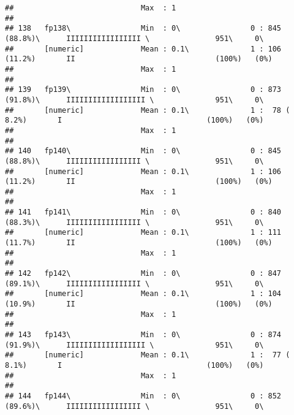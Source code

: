 \documentclass[]{article}
\begin{document}
\begin{verbatim}
##                             Max  : 1                                                                                           
## 
## 138   fp138\                Min  : 0\                0 : 845 (88.8%)\      IIIIIIIIIIIIIIIII \               951\     0\       
##       [numeric]             Mean : 0.1\              1 : 106 (11.2%)       II                                (100%)   (0%)     
##                             Max  : 1                                                                                           
## 
## 139   fp139\                Min  : 0\                0 : 873 (91.8%)\      IIIIIIIIIIIIIIIIII \              951\     0\       
##       [numeric]             Mean : 0.1\              1 :  78 ( 8.2%)       I                                 (100%)   (0%)     
##                             Max  : 1                                                                                           
## 
## 140   fp140\                Min  : 0\                0 : 845 (88.8%)\      IIIIIIIIIIIIIIIII \               951\     0\       
##       [numeric]             Mean : 0.1\              1 : 106 (11.2%)       II                                (100%)   (0%)     
##                             Max  : 1                                                                                           
## 
## 141   fp141\                Min  : 0\                0 : 840 (88.3%)\      IIIIIIIIIIIIIIIII \               951\     0\       
##       [numeric]             Mean : 0.1\              1 : 111 (11.7%)       II                                (100%)   (0%)     
##                             Max  : 1                                                                                           
## 
## 142   fp142\                Min  : 0\                0 : 847 (89.1%)\      IIIIIIIIIIIIIIIII \               951\     0\       
##       [numeric]             Mean : 0.1\              1 : 104 (10.9%)       II                                (100%)   (0%)     
##                             Max  : 1                                                                                           
## 
## 143   fp143\                Min  : 0\                0 : 874 (91.9%)\      IIIIIIIIIIIIIIIIII \              951\     0\       
##       [numeric]             Mean : 0.1\              1 :  77 ( 8.1%)       I                                 (100%)   (0%)     
##                             Max  : 1                                                                                           
## 
## 144   fp144\                Min  : 0\                0 : 852 (89.6%)\      IIIIIIIIIIIIIIIII \               951\     0\       

\end{verbatim}
\end{document}
